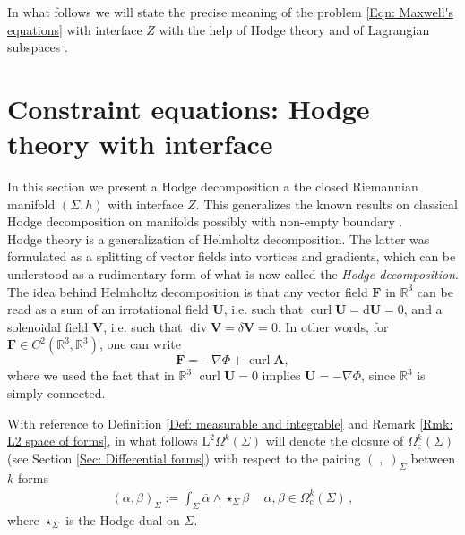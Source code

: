 In what follows we will state the precise meaning of the problem \eqref{Eqn: Maxwell's equations} with interface $Z$ with the help of Hodge theory and of Lagrangian subspaces \parencite{Everitt-Markus-99,Everitt-Markus-03,Everitt-Markus-05}.


\section{Constraint equations: Hodge theory with interface}\label{Sec: Non-dynamical equations: Hodge theory with interface}
In this section we present a Hodge decomposition a the closed Riemannian manifold $(\Sigma,h)$ with interface $Z$.
This generalizes the known results on classical Hodge decomposition on manifolds possibly with non-empty boundary \parencite{Amar-17,Axelsson-McIntosh-04,Gaffney-55,Gromov-91,Kodaira-49,Li-09,Schwarz-95,Scott-95,Zulfikar-Stroock-00}.\\

Hodge theory is a generalization of Helmholtz decomposition. The latter was formulated as a splitting of vector fields into vortices and gradients, which can be understood as a rudimentary form of what is now called the \emph{Hodge decomposition}. The idea behind Helmholtz decomposition is that any vector field $\mathbf{F}$ in $\mathbb{R}^3$ can be read as a sum of an irrotational field $\mathbf{U}$, i.e. such that $\operatorname{curl}\mathbf{U}=\mathrm{d}\mathbf{U}=0$, and a solenoidal field $\mathbf{V}$, i.e. such that $\operatorname{div}\mathbf{V}=\delta\mathbf{V}=0$. In other words, for $\mathbf{F}\in C^2(\mathbb{R}^3,\mathbb{R}^3)$, one can write
\begin{equation}
\mathbf{F}=-\nabla\Phi+\operatorname{curl}\mathbf{A},
\end{equation}
where we used the fact that in $\mathbb{R}^3$ $\operatorname{curl}\mathbf{U}=0$ implies $\mathbf{U}=-\nabla\Phi$, since  $\mathbb{R}^3$ is simply connected.

\begin{remark}%
	With reference to Definition \ref{Def: measurable and integrable} and Remark \ref{Rmk: L2 space of forms}, in what follows $\mathrm{L}^2\Omega^k(\Sigma)$ will denote the closure of $\Omega^k_{\mathrm{c}}(\Sigma)$ (see Section \ref{Sec: Differential forms}) with respect to the pairing $(\;,\;)_\Sigma$ between $k$-forms
	\begin{align}\label{Eqn: L2-scalar product}
	(\alpha,\beta)_\Sigma:=\int_\Sigma\overline{\alpha}\wedge\star_\Sigma\beta\,\quad \alpha,\beta\in\Omega^k_{\mathrm{c}}(\Sigma)\,,
	\end{align}
	where $\star_\Sigma$ is the Hodge dual on $\Sigma$.
\end{remark}

